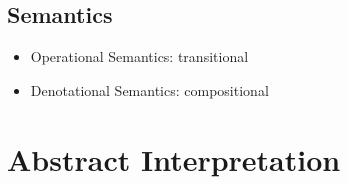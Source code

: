 \documentclass[12pt, twopage]{book}
\begin{document}
\section{Semantics}
\label{sec:semantics}

\begin{itemize}
\item Operational Semantics: transitional
\item Denotational Semantics: compositional
\end{itemize}


\chapter{Abstract Interpretation}
\label{chap:ai}
\end{document}

